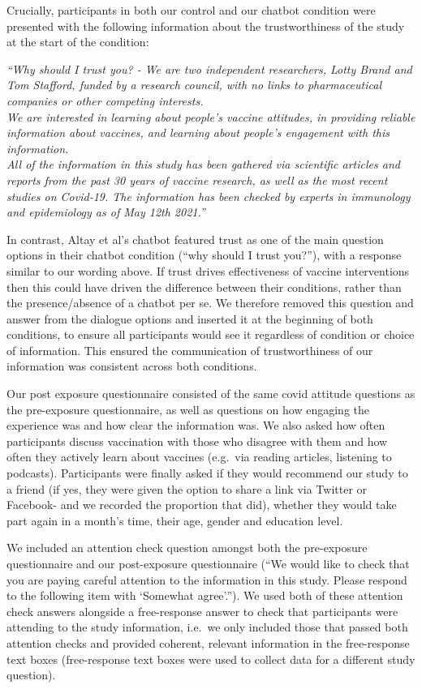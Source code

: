 \documentclass[
  english,
  ,jou,floatsintext]{apa6}
\begin{document}
Crucially, participants in both our control and our chatbot condition were presented with the following information about the trustworthiness of the study at the start of the condition:

\emph{``Why should I trust you? - We are two independent researchers, Lotty Brand and Tom Stafford, funded by a research council, with no links to pharmaceutical companies or other competing interests. }\\
\emph{We are interested in learning about people's vaccine attitudes, in providing reliable information about vaccines, and learning about people's engagement with this information. }\\
\emph{All of the information in this study has been gathered via scientific articles and reports from the past 30 years of vaccine research, as well as the most recent studies on Covid-19. The information has been checked by experts in immunology and epidemiology as of May 12th 2021.''}

In contrast, Altay et al's chatbot featured trust as one of the main question options in their chatbot condition (``why should I trust you?''), with a response similar to our wording above. If trust drives effectiveness of vaccine interventions then this could have driven the difference between their conditions, rather than the presence/absence of a chatbot per se. We therefore removed this question and answer from the dialogue options and inserted it at the beginning of both conditions, to ensure all participants would see it regardless of condition or choice of information. This ensured the communication of trustworthiness of our information was consistent across both conditions.

Our post exposure questionnaire consisted of the same covid attitude questions as the pre-exposure questionnaire, as well as questions on how engaging the experience was and how clear the information was. We also asked how often participants discuss vaccination with those who disagree with them and how often they actively learn about vaccines (e.g.~via reading articles, listening to podcasts). Participants were finally asked if they would recommend our study to a friend (if yes, they were given the option to share a link via Twitter or Facebook- and we recorded the proportion that did), whether they would take part again in a month's time, their age, gender and education level.

We included an attention check question amongst both the pre-exposure questionnaire and our post-exposure questionnaire (``We would like to check that you are paying careful attention to the information in this study. Please respond to the following item with `Somewhat agree'.''). We used both of these attention check answers alongside a free-response answer to check that participants were attending to the study information, i.e.~we only included those that passed both attention checks and provided coherent, relevant information in the free-response text boxes (free-response text boxes were used to collect data for a different study question).
\end{document}
